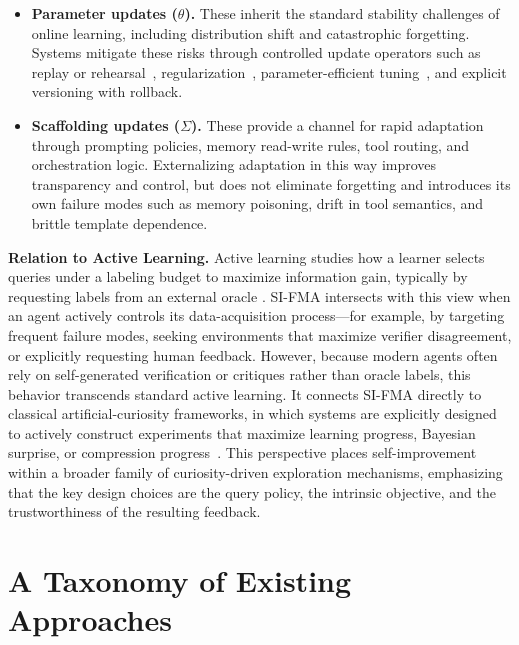 \documentclass{article}
\begin{document}
\begin{itemize}
    \item \textbf{Parameter updates ($\theta$).}
    These inherit the standard stability challenges of online learning, including distribution shift and catastrophic forgetting. Systems mitigate these risks through controlled update operators such as replay or rehearsal~\citep{robins1995catastrophic}, regularization~\citep{kirkpatrick2017overcoming,ramesh2026learning}, parameter-efficient tuning~\citep{hu2022lora}, and explicit versioning with rollback.

    \item \textbf{Scaffolding updates ($\Sigma$).}
    These provide a channel for rapid adaptation through prompting policies, memory read-write rules, tool routing, and orchestration logic. Externalizing adaptation in this way improves transparency and control, but does not eliminate forgetting and introduces its own failure modes such as memory poisoning, drift in tool semantics, and brittle template dependence.
\end{itemize}


\textbf{Relation to Active Learning.} Active learning studies how a learner selects queries under a labeling budget to maximize information gain, typically by requesting labels from an external oracle \citep{ren2021survey}. SI-FMA intersects with this view when an agent actively controls its data-acquisition process---for example, by targeting frequent failure modes, seeking environments that maximize verifier disagreement, or explicitly requesting human feedback. However, because modern agents often rely on self-generated verification or critiques rather than oracle labels, this behavior transcends standard active learning. It connects SI-FMA directly to classical artificial-curiosity frameworks, in which systems are explicitly designed to actively construct experiments that maximize learning progress, Bayesian surprise, or compression progress~\citep{schmidhuber1991possibility,storck1995reinforcement, schmidhuber2006developmental,schmidhuber2010formal,herrmann2026interestingness}. This perspective places self-improvement within a broader family of curiosity-driven exploration mechanisms, emphasizing that the key design choices are the query policy, the intrinsic objective, and the trustworthiness of the resulting feedback.


\section{A Taxonomy of Existing Approaches}
\label{sec:A_Taxonomy_of_Self_Improvement_Mechanisms}
\end{document}
